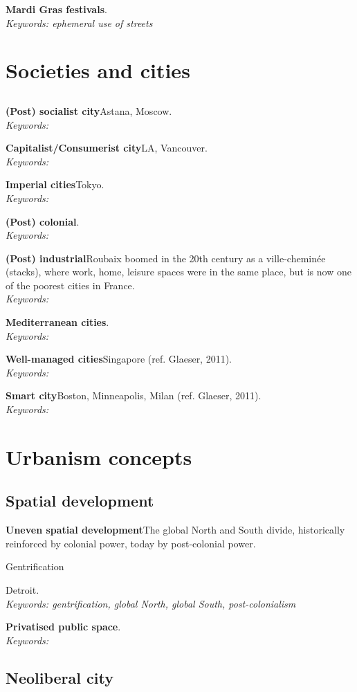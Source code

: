 \documentclass{article}
\newcommand{\entry}[3]{\textbf{#1}\quad #2. \\\textit{Keywords: #3}}
\begin{document}
\entry{Mardi Gras festivals}{}{ephemeral use of streets}

\section{Societies and cities}

\subsection{}

\entry{(Post) socialist city}{Astana, Moscow}{}

\entry{Capitalist/Consumerist city}{LA, Vancouver}{}

\entry{Imperial cities}{Tokyo}{}

\entry{(Post) colonial}{}{}

\entry{(Post) industrial}{Roubaix boomed in the 20th century as a ville-cheminée (stacks), where work, home, leisure spaces were in the same place, but is now one of the poorest cities in France}{}

\entry{Mediterranean cities}{}{}

\entry{Well-managed cities}{Singapore (ref. Glaeser, 2011)}{}

\entry{Smart city}{Boston, Minneapolis, Milan (ref. Glaeser, 2011)}{}

\section{Urbanism concepts}

\subsection{Spatial development}

\entry{Uneven spatial development}{The global North and South divide, historically reinforced by colonial power, today by post-colonial power.

Gentrification

Detroit}{gentrification, global North, global South, post-colonialism}

\entry{Privatised public space}{}{}

\subsection{Neoliberal city}
\end{document}

